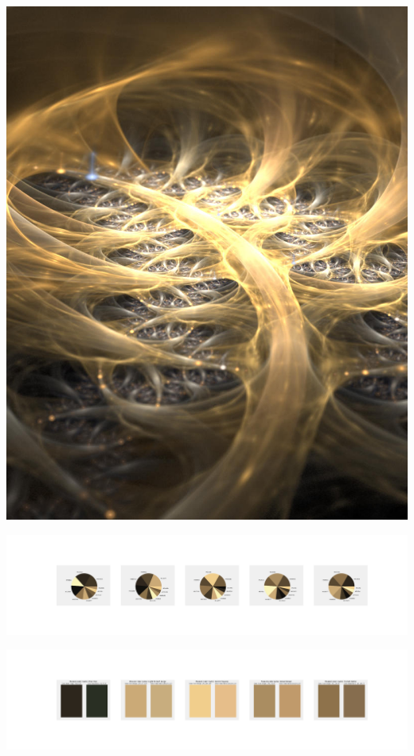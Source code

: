 \documentclass[11pt]{article}
\begin{document}
\begin{landscape}
    \begin{center}
    \includegraphics[width=\textwidth]{./nbimg/file (15).jpg}
    \end{center}

    \begin{center}
    \includegraphics[width=250mm]{./nbimg/pie-56.jpg}
    \end{center}

    \begin{center}
    \includegraphics[width=250mm]{./nbimg/peak-56.jpg}
    \end{center}
    


\end{landscape}
\end{document}
